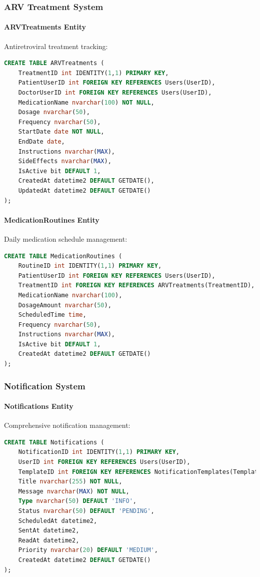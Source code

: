 \documentclass[12pt,a4paper]{article}
\begin{document}
\subsubsection{ARV Treatment System}

\paragraph{ARVTreatments Entity}
Antiretroviral treatment tracking:

\begin{lstlisting}[language=SQL]
CREATE TABLE ARVTreatments (
    TreatmentID int IDENTITY(1,1) PRIMARY KEY,
    PatientUserID int FOREIGN KEY REFERENCES Users(UserID),
    DoctorUserID int FOREIGN KEY REFERENCES Users(UserID),
    MedicationName nvarchar(100) NOT NULL,
    Dosage nvarchar(50),
    Frequency nvarchar(50),
    StartDate date NOT NULL,
    EndDate date,
    Instructions nvarchar(MAX),
    SideEffects nvarchar(MAX),
    IsActive bit DEFAULT 1,
    CreatedAt datetime2 DEFAULT GETDATE(),
    UpdatedAt datetime2 DEFAULT GETDATE()
);
\end{lstlisting}

\paragraph{MedicationRoutines Entity}
Daily medication schedule management:

\begin{lstlisting}[language=SQL]
CREATE TABLE MedicationRoutines (
    RoutineID int IDENTITY(1,1) PRIMARY KEY,
    PatientUserID int FOREIGN KEY REFERENCES Users(UserID),
    TreatmentID int FOREIGN KEY REFERENCES ARVTreatments(TreatmentID),
    MedicationName nvarchar(100),
    DosageAmount nvarchar(50),
    ScheduledTime time,
    Frequency nvarchar(50),
    Instructions nvarchar(MAX),
    IsActive bit DEFAULT 1,
    CreatedAt datetime2 DEFAULT GETDATE()
);
\end{lstlisting}

\subsubsection{Notification System}

\paragraph{Notifications Entity}
Comprehensive notification management:

\begin{lstlisting}[language=SQL]
CREATE TABLE Notifications (
    NotificationID int IDENTITY(1,1) PRIMARY KEY,
    UserID int FOREIGN KEY REFERENCES Users(UserID),
    TemplateID int FOREIGN KEY REFERENCES NotificationTemplates(TemplateID),
    Title nvarchar(255) NOT NULL,
    Message nvarchar(MAX) NOT NULL,
    Type nvarchar(50) DEFAULT 'INFO',
    Status nvarchar(50) DEFAULT 'PENDING',
    ScheduledAt datetime2,
    SentAt datetime2,
    ReadAt datetime2,
    Priority nvarchar(20) DEFAULT 'MEDIUM',
    CreatedAt datetime2 DEFAULT GETDATE()
);
\end{lstlisting}
\end{document}
